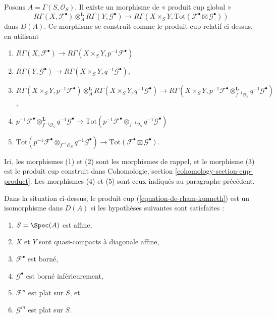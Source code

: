 \medskip\noindent
Posons $A = \Gamma(S, \mathcal{O}_S)$. Il existe un morphisme de « produit cup global »
\begin{equation}
\label{equation-de-rham-kunneth}
R\Gamma(X, \mathcal{F}^\bullet)
\otimes_A^\mathbf{L}
R\Gamma(Y, \mathcal{G}^\bullet)
\longrightarrow
R\Gamma(X \times_S Y,
\text{Tot}(\mathcal{F}^\bullet \boxtimes \mathcal{G}^\bullet))
\end{equation}
dans $D(A)$. Ce morphisme se construit comme le produit cup relatif ci-dessus,
en utilisant
\begin{enumerate}
\item $R\Gamma(X, \mathcal{F}^\bullet) \to
R\Gamma(X \times_S Y, p^{-1}\mathcal{F}^\bullet)$
\item $R\Gamma(Y, \mathcal{G}^\bullet) \to
R\Gamma(X \times_S Y, q^{-1}\mathcal{G}^\bullet)$,
\item $R\Gamma(X \times_S Y, p^{-1}\mathcal{F}^\bullet)
\otimes_A^\mathbf{L} R\Gamma(X \times_S Y, q^{-1}\mathcal{G}^\bullet) \to
R\Gamma(X \times_S Y,
p^{-1}\mathcal{F}^\bullet \otimes_{f^{-1}\mathcal{O}_S}^\mathbf{L}
q^{-1}\mathcal{G}^\bullet)$,
\item
$p^{-1}\mathcal{F}^\bullet \otimes_{f^{-1}\mathcal{O}_S}^\mathbf{L}
q^{-1}\mathcal{G}^\bullet \to
\text{Tot}(p^{-1}\mathcal{F}^\bullet \otimes_{f^{-1}\mathcal{O}_S}
q^{-1}\mathcal{G}^\bullet)$
\item
$\text{Tot}(p^{-1}\mathcal{F}^\bullet \otimes_{f^{-1}\mathcal{O}_S}
q^{-1}\mathcal{G}^\bullet) \to \text{Tot}(\mathcal{F}^\bullet \boxtimes
\mathcal{G}^\bullet)$.
\end{enumerate}
Ici, les morphismes (1) et (2) sont les morphismes de rappel, et le morphisme (3)
est le produit cup construit dans Cohomologie, section \ref{cohomology-section-cup-product}.
Les morphismes (4) et (5) sont ceux indiqués au paragraphe précédent.

\begin{lemma}
\label{lemma-kunneth-special}
Dans la situation ci-dessus, le produit cup (\ref{equation-de-rham-kunneth})
est un isomorphisme dans $D(A)$ si les hypothèses suivantes sont satisfaites :
\begin{enumerate}
\item $S = \Spec(A)$ est affine,
\item $X$ et $Y$ sont quasi-compacts à diagonale affine,
\item $\mathcal{F}^\bullet$ est borné,
\item $\mathcal{G}^\bullet$ est borné inférieurement,
\item $\mathcal{F}^n$ est plat sur $S$, et
\item $\mathcal{G}^m$ est plat sur $S$.
\end{enumerate}
\end{lemma}

